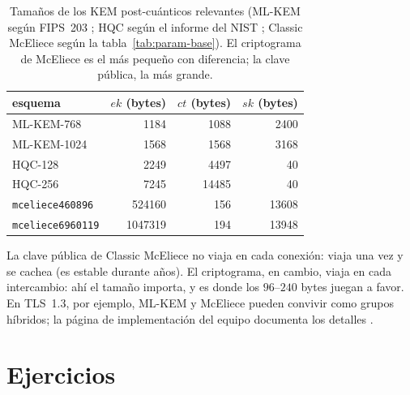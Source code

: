 \begin{table}[htbp]
\centering
\small
\setlength{\tabcolsep}{7pt}
\begin{tabular}{lrrr}
\toprule
esquema & $ek$ (bytes) & $ct$ (bytes) & $sk$ (bytes)\\
\midrule
ML-KEM-768 & 1184 & 1088 & 2400\\
ML-KEM-1024 & 1568 & 1568 & 3168\\
HQC-128 & 2249 & 4497 & 40\\
HQC-256 & 7245 & 14485 & 40\\
\texttt{mceliece460896} & \num{524160} & 156 & \num{13608}\\
\texttt{mceliece6960119} & \num{1047319} & 194 & \num{13948}\\
\bottomrule
\end{tabular}
\caption{Tamaños de los KEM post-cuánticos relevantes (ML-KEM según
FIPS~203 \cite{fips203}; HQC según el informe del NIST \cite{nist8545};
Classic McEliece según la tabla~\ref{tab:param-base}). El criptograma
de McEliece es el más pequeño con diferencia; la clave pública, la más
grande.}
\label{tab:param-contexto}
\end{table}

\begin{practica}
La clave pública de Classic McEliece no viaja en cada conexión: viaja
una vez y se cachea (es estable durante años). El criptograma, en
cambio, viaja en cada intercambio: ahí el tamaño importa, y es donde
los $96$--$240$ bytes juegan a favor. En TLS~1.3, por ejemplo, ML-KEM
y McEliece pueden convivir como grupos híbridos; la página de
implementación del equipo documenta los detalles
\cite{cmimpl}.
\end{practica}

\section{Ejercicios}\label{sec:param-ejercicios}

